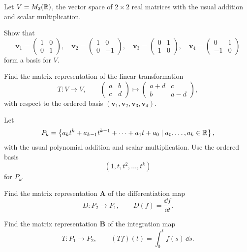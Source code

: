 \begin{problem}
Let $V=M_2(\mathbb{R})$, the vector space of $2\times2$ real matrices with the usual addition and scalar multiplication.
\begin{problemsubparts}
\item Show that
\[
\mathbf v_1=
\begin{pmatrix}
1&0\\0&1
\end{pmatrix},
\quad
\mathbf v_2=
\begin{pmatrix}
1&0\\0&-1
\end{pmatrix},
\quad
\mathbf v_3=
\begin{pmatrix}
0&1\\1&0
\end{pmatrix},
\quad
\mathbf v_4=
\begin{pmatrix}
0&1\\-1&0
\end{pmatrix}
\]
form a basis for $V$.
\item Find the matrix representation of the linear transformation
\[
T\colon V\to V,
\qquad
\begin{pmatrix}
a&b\\c&d
\end{pmatrix}
\mapsto
\begin{pmatrix}
a+d&c\\b&a-d
\end{pmatrix},
\]
with respect to the ordered basis $(\mathbf v_1,\mathbf v_2,\mathbf v_3,\mathbf v_4)$.
\end{problemsubparts}
\end{problem}

\begin{problem}
Let
\[
P_k=\left\{a_k t^k+a_{k-1}t^{k-1}+\cdots+a_1t+a_0\mid a_0,\dots,a_k\in\mathbb{R}\right\},
\]
with the usual polynomial addition and scalar multiplication. Use the ordered basis
\[
(1,t,t^2,\dots,t^k)
\]
for $P_k$.
\begin{problemsubparts}
\item Find the matrix representation $\mathbf A$ of the differentiation map
\[
D\colon P_2\to P_1,
\qquad
D(f)=\frac{\dd f}{\dd t}.
\]
\item Find the matrix representation $\mathbf B$ of the integration map
\[
T\colon P_1\to P_2,
\qquad
(Tf)(t)=\int_0^t f(s)\,\dd s.
\]
\end{problemsubparts}
\end{problem}

